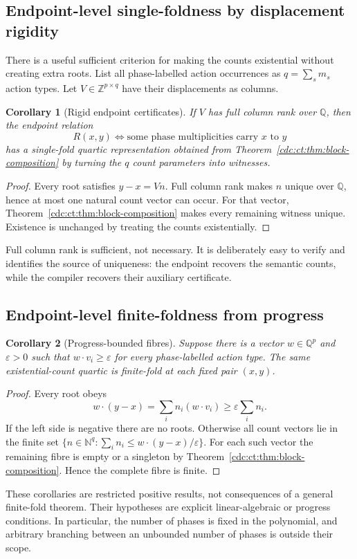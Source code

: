 \documentclass[11pt,a4paper]{article}
\newtheorem{corollary}[corollary]{Corollary}
\theoremstyle{definition}
\theoremstyle{remark}
\newcommand{\N}{\mathbb N}
\newcommand{\Z}{\mathbb Z}
\newcommand{\Q}{\mathbb Q}
\begin{document}
\subsection{Endpoint-level single-foldness by displacement rigidity}
There is a useful sufficient criterion for making the counts existential without creating extra roots. List all phase-labelled action occurrences as $q=\sum_s m_s$ action types. Let $V\in\Z^{p\times q}$ have their displacements as columns.

\begin{corollary}[Rigid endpoint certificates]\label{cdc:ct:cor:rank}
If $V$ has full column rank over $\Q$, then the endpoint relation
\[
 R(x,y)\iff\text{some phase multiplicities carry $x$ to $y$}
\]
has a single-fold quartic representation obtained from Theorem~\ref{cdc:ct:thm:block-composition} by turning the $q$ count parameters into witnesses.
\end{corollary}
\begin{proof}
Every root satisfies $y-x=Vn$. Full column rank makes $n$ unique over $\Q$, hence at most one natural count vector can occur. For that vector, Theorem~\ref{cdc:ct:thm:block-composition} makes every remaining witness unique. Existence is unchanged by treating the counts existentially.
\end{proof}
Full column rank is sufficient, not necessary. It is deliberately easy to verify and identifies the source of uniqueness: the endpoint recovers the semantic counts, while the compiler recovers their auxiliary certificate.

\subsection{Endpoint-level finite-foldness from progress}
\begin{corollary}[Progress-bounded fibres]\label{cdc:ct:cor:progress}
Suppose there is a vector $w\in\Q^p$ and $\varepsilon>0$ such that
$w\mathbin{\cdot}v_i\ge\varepsilon$ for every phase-labelled action type. The same existential-count quartic is finite-fold at each fixed pair $(x,y)$.
\end{corollary}
\begin{proof}
Every root obeys
\[
 w\mathbin{\cdot}(y-x)=\sum_i n_i(w\mathbin{\cdot}v_i)
                 \ge\varepsilon\sum_i n_i.
\]
If the left side is negative there are no roots. Otherwise all count vectors lie in the finite set $\{n\in\N^q:\sum_i n_i\le w\cdot(y-x)/\varepsilon\}$. For each such vector the remaining fibre is empty or a singleton by Theorem~\ref{cdc:ct:thm:block-composition}. Hence the complete fibre is finite.
\end{proof}
These corollaries are restricted positive results, not consequences of a general finite-fold theorem. Their hypotheses are explicit linear-algebraic or progress conditions. In particular, the number of phases is fixed in the polynomial, and arbitrary branching between an unbounded number of phases is outside their scope.
\end{document}
